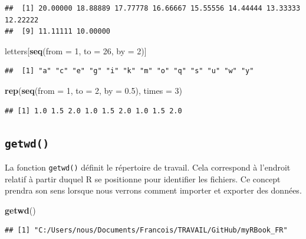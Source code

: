 \documentclass[
]{book}
\newenvironment{Shaded}{\begin{snugshade}}{\end{snugshade}}
\newcommand{\DataTypeTok}[1]{\textcolor[rgb]{0.13,0.29,0.53}{#1}}
\newcommand{\DecValTok}[1]{\textcolor[rgb]{0.00,0.00,0.81}{#1}}
\newcommand{\FloatTok}[1]{\textcolor[rgb]{0.00,0.00,0.81}{#1}}
\newcommand{\KeywordTok}[1]{\textcolor[rgb]{0.13,0.29,0.53}{\textbf{#1}}}
\newcommand{\NormalTok}[1]{#1}
\begin{document}
\begin{verbatim}
##  [1] 20.00000 18.88889 17.77778 16.66667 15.55556 14.44444 13.33333 12.22222
##  [9] 11.11111 10.00000
\end{verbatim}

\begin{Shaded}
\begin{Highlighting}[]
\NormalTok{letters[}\KeywordTok{seq}\NormalTok{(}\DataTypeTok{from =} \DecValTok{1}\NormalTok{, }\DataTypeTok{to =} \DecValTok{26}\NormalTok{, }\DataTypeTok{by =} \DecValTok{2}\NormalTok{)]}
\end{Highlighting}
\end{Shaded}

\begin{verbatim}
##  [1] "a" "c" "e" "g" "i" "k" "m" "o" "q" "s" "u" "w" "y"
\end{verbatim}

\begin{Shaded}
\begin{Highlighting}[]
\KeywordTok{rep}\NormalTok{(}\KeywordTok{seq}\NormalTok{(}\DataTypeTok{from =} \DecValTok{1}\NormalTok{, }\DataTypeTok{to =} \DecValTok{2}\NormalTok{, }\DataTypeTok{by =} \FloatTok{0.5}\NormalTok{), }\DataTypeTok{times =} \DecValTok{3}\NormalTok{)}
\end{Highlighting}
\end{Shaded}

\begin{verbatim}
## [1] 1.0 1.5 2.0 1.0 1.5 2.0 1.0 1.5 2.0
\end{verbatim}

\hypertarget{l015getwd}{%
\subsection{\texorpdfstring{\texttt{getwd()}}{getwd()}}\label{l015getwd}}

La fonction \texttt{getwd()} définit le répertoire de travail. Cela correspond à l'endroit relatif à partir duquel R se positionne pour identifier les fichiers. Ce concept prendra son sens lorsque nous verrons comment importer et exporter des données.

\begin{Shaded}
\begin{Highlighting}[]
\KeywordTok{getwd}\NormalTok{()}
\end{Highlighting}
\end{Shaded}

\begin{verbatim}
## [1] "C:/Users/nous/Documents/Francois/TRAVAIL/GitHub/myRBook_FR"
\end{verbatim}
\end{document}
